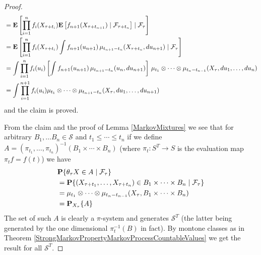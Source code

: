 \begin{proof}
\begin{align*}
&=\cexpectationlong{\mathcal{F}_\tau}{\prod_{i=1}^n f_i(X_{\tau + t_i}) \cexpectationlong{\mathcal{F}_{\tau+t_n}}{f_{n+1}(X_{\tau + t_{n+1}})} } \\
&=\cexpectationlong{\mathcal{F}_\tau}{\prod_{i=1}^n f_i(X_{\tau + t_i}) \int f_{n+1}(u_{n+1}) \, \mu_{t_{n+1} - t_n}(X_{\tau + t_n}, du_{n+1})} \\
&=\int \prod_{i=1}^n f_i(u_i) \left[\int f_{n+1}(u_{n+1}) \, \mu_{t_{n+1} - t_n}(u_n, du_{n+1}) \right] \, \mu_{t_1} \otimes \dotsb \otimes \mu_{t_n - t_{n-1}}(X_\tau, du_1, \dotsc, du_n)\\
&=\int \prod_{i=1}^{n+1} f_i(u_i) \mu_{t_1} \otimes \dotsb \otimes \mu_{t_{n+1} - t_{n}}(X_\tau, du_1, \dotsc, du_{n+1})\\
\end{align*}
and the claim is proved.

From the claim and the proof of Lemma \ref{MarkovMixtures} we see that for arbitrary $B_1, \dotsc B_n \in \mathcal{S}$ and $t_1 \leq \dotsb \leq t_n$ if we
define $A = (\pi_{t_1}, \dotsc, \pi_{t_n})^{-1}(B_1 \times \dotsb \times B_n)$ (where $\pi_t : S^T \to S$ is the evaluation map $\pi_t f = f(t)$) we have
\begin{align*}
&\cprobability{\mathcal{F}_\tau}{\theta_\tau X \in A} \\
&=\cprobability{\mathcal{F}_\tau}{(X_{\tau+t_1}, \dotsc, X_{\tau+t_n}) \in B_1 \times \dotsb \times B_n} \\
&=\mu_{t_1} \otimes \dotsb \otimes \mu_{t_n - t_{n-1}}(X_\tau, B_1 \times \dotsb \times B_n) \\
&= \sprobability{A}{X_\tau}
\end{align*}
The set of such $A$ is clearly a $\pi$-system and generates $\mathcal{S}^T$ (the latter being generated by the one dimensional $\pi_t^{-1}(B)$ in fact).  By montone classes as in Theorem \ref{StrongMarkovPropertyMarkovProcessCountableValues} we get the result for all $\mathcal{S}^T$.
\end{proof}

